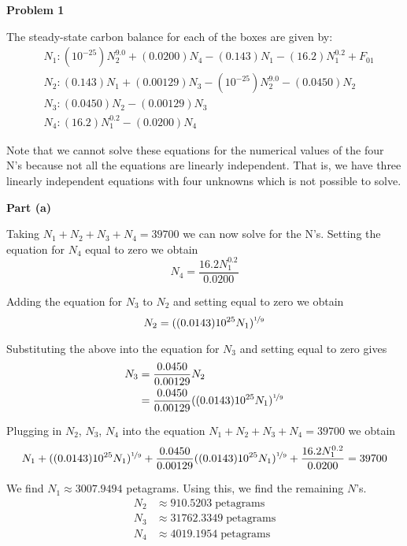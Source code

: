 \documentclass[final,12pt,reqno]{amsart}
\begin{document}
\thispagestyle{fancy}

\textbf{Problem 1}

The steady-state carbon balance for each of the boxes are given by:
\begin{align*}
	&N_1: (10^{-25})N_2^{9.0} + (0.0200)N_4 - (0.143)N_1 - (16.2)N_1^{0.2} + F_{01}\\
	&N_2: (0.143)N_1 + (0.00129)N_3 - (10^{-25})N_2^{9.0} - (0.0450)N_2\\
	&N_3: (0.0450)N_2 - (0.00129)N_3\\
	&N_4: (16.2)N_1^{0.2} - (0.0200)N_4
\end{align*}

Note that we cannot solve these equations for the numerical values of the four N's because not all the equations are linearly independent. That is, we have three linearly independent equations with four unknowns which is not possible to solve.

\textbf{Part (a)}

Taking $N_1 + N_2 + N_3 + N_4 = 39700$ we can now solve for the N's. Setting the equation for $N_4$ equal to zero we obtain
\[
	N_4 = \frac{16.2N_1^{0.2}}{0.0200}
\]

Adding the equation for $N_3$ to $N_2$ and setting equal to zero we obtain
\[
	N_2 = ((0.0143)10^{25}N_1)^{\nicefrac{1}{9}}
\]

Substituting the above into the equation for $N_3$ and setting equal to zero gives
\begin{align*}
	N_3 &= \frac{0.0450}{0.00129}N_2\\
		&= \frac{0.0450}{0.00129}((0.0143)10^{25}N_1)^{\nicefrac{1}{9}}
\end{align*}

Plugging in $N_2$, $N_3$, $N_4$ into the equation $N_1 + N_2 + N_3 + N_4 = 39700$ we obtain
\begin{align*}
	N_1 + ((0.0143)10^{25}N_1)^{\nicefrac{1}{9}} + \frac{0.0450}{0.00129}((0.0143)10^{25}N_1)^{\nicefrac{1}{9}} + \frac{16.2N_1^{0.2}}{0.0200} = 39700
\end{align*}

We find $N_1 \approx 3007.9494$ petagrams. Using this, we find the remaining $N$'s.
\begin{align*}
	N_2 &\approx 910.5203 \; \text{petagrams}\\
	N_3 &\approx 31762.3349 \; \text{petagrams}\\
	N_4 &\approx 4019.1954 \; \text{petagrams}
\end{align*}
\end{document}
